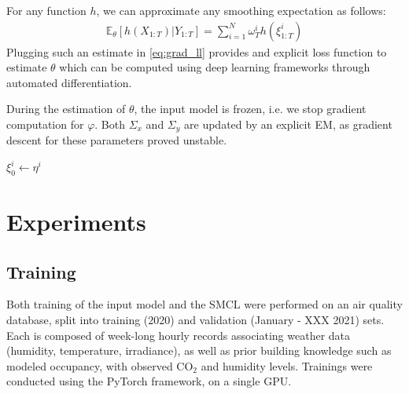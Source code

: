 \documentclass{article}
\begin{document}
For any function $h$, we can approximate any smoothing expectation as follows:
\begin{align*}
	\mathbb{E}_\theta \left[ h(X_{1:T}) | Y_{1:T} \right] = \sum_{i=1}^N \omega_T^i h(\xi^i_{1:T})
\end{align*}
Plugging such an estimate in \ref{eq:grad_ll} provides and explicit loss function to estimate $\theta$ which can be computed using deep learning frameworks through automated differentiation.

During the estimation of $\theta$, the input model is frozen, i.e. we stop gradient computation for $\varphi$. Both $\Sigma_x$ and $\Sigma_y$ are updated by an explicit EM, as gradient descent for these parameters proved unstable.

\begin{algorithm}
	$\xi_0^i \gets \eta^i$\;
	\caption{Particle filter. $\varphi_{\mu, \Sigma}$ is the multivariate normal density function with mean $\mu$ and covariance matrix $\Sigma$. \textcolor{red}{Peut-être plutôt un algorithme complet avec toutes les étapes : pré-entraînement de $\varphi$, approximation du gradient, mise \`a jour des paramètres.}}
	\label{algo:particle_filter}
\end{algorithm}

\section{Experiments}
\label{sec:exp}

\subsection{Training}%
\label{sub:training}
Both training of the input model and the SMCL were performed on an air quality database, split into training (2020) and validation (January - XXX 2021) sets.
Each is composed of week-long hourly records associating weather data (humidity, temperature, irradiance), as well as prior building knowledge such as modeled occupancy, with observed \ensuremath{\mathrm{CO_2}} and humidity levels.
Trainings were conducted using the PyTorch framework, on a single GPU.
\end{document}
